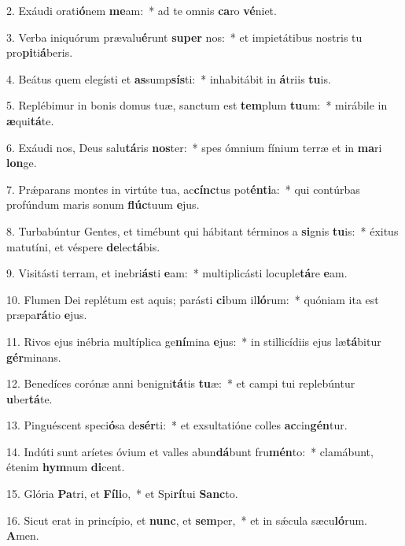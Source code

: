 2. Exáudi orati\textbf{ó}nem \textbf{me}am:~*  ad te omnis \textbf{ca}ro \textbf{vé}niet.\

3. Verba iniquórum prævalu\textbf{é}runt \textbf{su}\textbf{per} nos:~*  et impietátibus nostris tu pro\textbf{pi}ti\textbf{á}beris.\

4. Beátus quem elegísti et \textbf{as}sump\textbf{sís}ti:~*  inhabitábit in \textbf{á}triis \textbf{tu}is.\

5. Replébimur in bonis domus tuæ, sanctum est \textbf{tem}plum \textbf{tu}um:~*  mirábile in \textbf{æ}qui\textbf{tá}te.\

6. Exáudi nos, Deus salu\textbf{tá}ris \textbf{nos}ter:~*  spes ómnium fínium terræ et in \textbf{ma}ri \textbf{lon}ge.\

7. Prǽparans montes in virtúte tua, ac\textbf{cínc}tus pot\textbf{én}\textbf{ti}a:~*  qui contúrbas profúndum maris sonum \textbf{flúc}tuum \textbf{e}jus.\

8. Turbabúntur Gentes, et timébunt qui hábitant términos a \textbf{si}gnis \textbf{tu}is:~*  éxitus matutíni, et véspere \textbf{de}lec\textbf{tá}bis.\

9. Visitásti terram, et inebri\textbf{ás}ti \textbf{e}am:~*  multiplicásti locuple\textbf{tá}re \textbf{e}am.\

10. Flumen Dei replétum est aquis; parásti \textbf{ci}bum il\textbf{ló}rum:~*  quóniam ita est præpa\textbf{rá}tio \textbf{e}jus.\

11. Rivos ejus inébria multíplica ge\textbf{ní}mina \textbf{e}jus:~*  in stillicídiis ejus læ\textbf{tá}bitur \textbf{gér}minans.\

12. Benedíces corónæ anni benigni\textbf{tá}tis \textbf{tu}æ:~*  et campi tui replebúntur \textbf{u}ber\textbf{tá}te.\

13. Pinguéscent speci\textbf{ó}sa de\textbf{sér}ti:~*  et exsultatióne colles \textbf{ac}cin\textbf{gén}tur.\

14. Indúti sunt aríetes óvium et valles abun\textbf{dá}bunt fru\textbf{mén}to:~*  clamábunt, étenim \textbf{hym}num \textbf{di}cent.\

15. Glória \textbf{Pa}tri, et \textbf{Fí}\textbf{li}o,~*  et Spi\textbf{rí}tui \textbf{Sanc}to.\

16. Sicut erat in princípio, et \textbf{nunc}, et \textbf{sem}per,~*  et in sǽcula sæcu\textbf{ló}rum. \textbf{A}men.\

